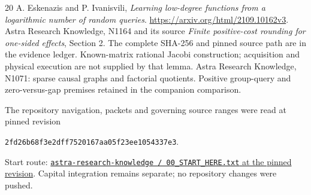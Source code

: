 \documentclass[11pt,a4paper]{article}
\begin{document}
\begin{thebibliography}{20}
 A. Eskenazis and P. Ivanisvili, \emph{Learning low-degree functions from a logarithmic number of random queries}. \url{https://arxiv.org/html/2109.10162v3}.
 Astra Research Knowledge, N1164 and its source \emph{Finite positive-cost rounding for one-sided effects}, Section 2. The complete SHA-256 and pinned source path are in the evidence ledger. Known-matrix rational Jacobi construction; acquisition and physical execution are not supplied by that lemma.
 Astra Research Knowledge, N1071: sparse causal graphs and factorial quotients. Positive group-query and zero-versus-gap premises retained in the companion comparison.
\end{thebibliography}
The repository navigation, packets and governing source ranges were read at pinned revision
\begin{center}\small\texttt{2fd26b68f3e2dff7520167aa05f23ee1054337e3}.\end{center}
Start route: \href{https://github.com/harjassand/astra-research-knowledge/blob/2fd26b68f3e2dff7520167aa05f23ee1054337e3/00_START_HERE.txt}{\texttt{astra-research-knowledge / 00\_START\_HERE.txt} at the pinned revision}.
Capital integration remains separate; no repository changes were pushed.
\end{document}
